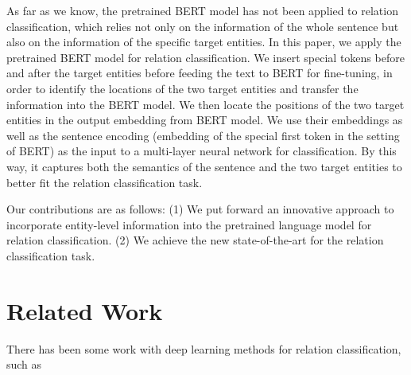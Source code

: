 \documentclass[11pt]{article}
\providecommand{\cite}[1]{\citeauthoryear{#1}}
\renewcommand{\cite}{\citep}
\begin{document}
As far as we know, the pretrained BERT model \cite{bert_Jacobv_corr_bert_2018} has not been 
applied to relation classification, which relies 
not only on the information of the whole sentence but also 
on the information of the specific target entities.
In this paper, we apply the pretrained BERT model for relation classification. 
We insert special tokens before and after the target entities 
before feeding the text to BERT for fine-tuning, 
in order to
identify the locations of the two target
entities and transfer the information into the BERT model. 
We then locate the positions of the two target entities in the output embedding
from BERT model. We use their embeddings as well as the sentence encoding (embedding of the special first token in the setting of BERT)
as the input to a multi-layer neural network for classification.
By this way, it captures both the semantics of the sentence and
the two target entities to better fit the relation classification task.

Our contributions are as follows: (1) We put forward an innovative approach
to incorporate entity-level information into the pretrained language model for relation classification. (2) We achieve the new state-of-the-art for the relation classification task.




 \section{Related Work}  
\label{related}


There has been some work with deep learning methods for relation
classification, such as 
\cite{Socher_EMNLP_2012,Zeng_coling_2014,Yu_NIPS_Worksho_2014,Nogueira_ACL_2015}
\end{document}

